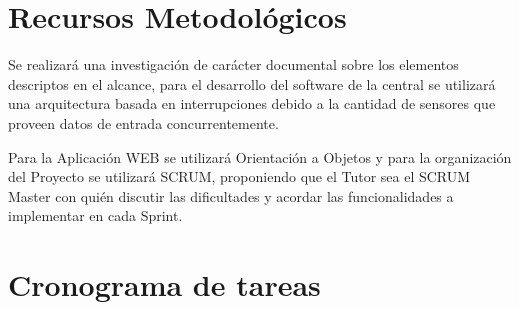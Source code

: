 \documentclass[a4paper,11pt, spanish]{article}
\begin{document}
\section{Recursos Metodológicos}
Se realizará una investigación de carácter documental sobre los elementos descriptos en el alcance, para el desarrollo del software de la central se utilizará una arquitectura basada en interrupciones debido a la cantidad de sensores que proveen datos de entrada concurrentemente.

Para la Aplicación WEB se utilizará Orientación a Objetos y para la organización del Proyecto se utilizará SCRUM, proponiendo que el Tutor sea el SCRUM Master con quién discutir las dificultades y acordar las funcionalidades a implementar en cada Sprint.  

\section{Cronograma de tareas}
\end{document}
